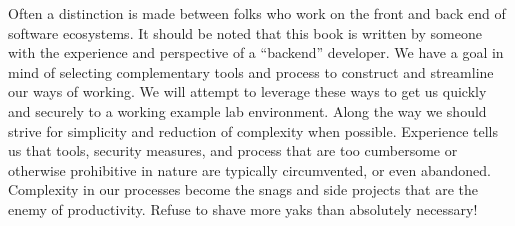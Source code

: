 Often a distinction is made between folks
who work on the front and back end of software ecosystems. It should be noted that this book is written by someone with the
experience and perspective of a ``backend'' developer.
\justify{}
We have a goal in mind of selecting complementary tools and process to construct
and streamline our ways of working. We will attempt to leverage these ways to
get us quickly and securely to a working example lab environment. Along the
way we should strive for simplicity and reduction of complexity when possible.
Experience tells us that tools, security measures, and process that are too cumbersome
or otherwise prohibitive in nature are typically circumvented, or even abandoned.
Complexity in our processes become the snags and side projects that are the
enemy of productivity.
\justify{}
Refuse to shave more yaks\cite{yak} than absolutely necessary!
